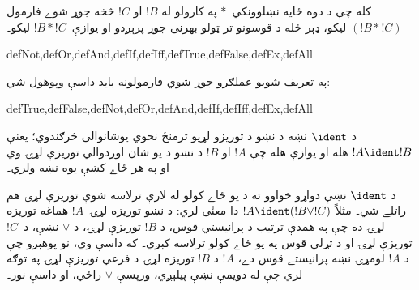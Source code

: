 \documentclass[../../../include/open-logic-section]{subfiles}
\begin{document}
کله چې د دوه ځايه نښلوونکي~$\ast$ په کارولو له $!B$ او $!C$ څخه
جوړ شوے فارمول $(!B \ast !C)$ ليکو، ډېر ځله د قوسونو تر ټولو بهرنی
جوړ پرېږدو او يوازې~$!B \ast !C$ ليکو۔

\begin{tagblock}{defNot,defOr,defAnd,defIf,defIff,defTrue,defFalse,defEx,defAll}
\begin{defn}
په تعريف شويو عملګرو جوړ شوي فارمولونه بايد داسې وپوهول شي:

\begin{tagenumerate}{defTrue,defFalse,defNot,defOr,defAnd,defIf,defIff,defEx,defAll}







\end{tagenumerate}
\end{defn}
\end{tagblock}

\begin{defn}
د $\ident$ نښه د نښو د توريزو لړيو ترمنځ نحوي يوشانوالی څرګندوي؛
يعنې $!A \ident !B$ هله او يوازې هله چې $!A$ او $!B$ د نښو د يو
شان اوږدوالي توريزې لړۍ وي او په هر ځاے کښې يوه نښه ولري۔
\end{defn}

د $\ident$ نښې دواړو خواوو ته د يو ځاے کولو له لارې ترلاسه شوې
توريزې لړۍ هم راتلے شي۔ مثلاً $!A \ident (!B \lor !C)$ دا معنٰی لري:
د نښو توريزه لړۍ~$!A$ هماغه توريزه لړۍ ده چې په همدې ترتيب د پرانيستي
قوس، د $!B$ توريزې لړۍ، د $\lor$ نښې، د~$!C$ توريزې لړۍ او د تړلي
قوس په يو ځاے کولو ترلاسه کېږي۔ که داسې وي، نو پوهېږو چې د $!A$
لومړۍ نښه پرانيستے قوس دے، $!A$ د $!B$ توريزه لړۍ د فرعي توريزې
لړۍ په توګه لري چې له دويمې نښې پيلېږي، ورپسې $\lor$ راځي، او داسې نور۔
\end{document}
